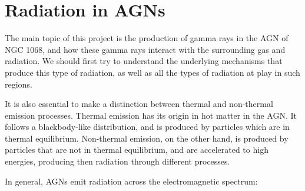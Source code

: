 \section{Radiation in AGNs}

The main topic of this project is the production of gamma rays in the AGN of NGC 1068, and how these gamma rays interact with the surrounding gas and radiation. We should first try to understand the underlying mechanisms that produce this type of radiation, as well as all the types of radiation at play in such regions.

It is also essential to make a distinction between thermal and non-thermal emission processes. Thermal emission has its origin in hot matter in the AGN. It follows a blackbody-like distribution, and is produced by particles which are in thermal equilibrium. Non-thermal emission, on the other hand, is produced by particles that are not in thermal equilibrium, and are accelerated to high energies, producing then radiation through different processes.

In general, AGNs emit radiation across the electromagnetic spectrum:

